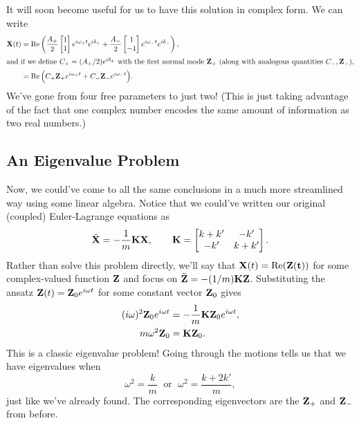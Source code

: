 \documentclass[../p111main.tex]{subfiles}
\begin{document}
It will soon become useful for us to have this solution in complex form.
We can write
\begin{align*}
    \mathbf{X}(t) &= \operatorname{Re} \left( \frac{A_+}{2} \begin{bmatrix} 1 \\ 1 \end{bmatrix} e^{i \omega_+ t} e^{i \delta_+} + \frac{A_-}{2} \begin{bmatrix} 1 \\ -1 \end{bmatrix} e^{i \omega_- t} e^{i \delta_-} \right), \\
    \intertext{and if we define $C_+ = (A_+ / 2) e^{i\delta_+}$ with the first normal mode $\mathbf{Z}_+$ (along with analogous quantities $C_-, \mathbf{Z}_-$),}
    &= \operatorname{Re} \Big( C_+ \mathbf{Z}_+ e^{i\omega_+ t} + C_- \mathbf{Z}_- e^{i\omega_- t} \Big).
\end{align*}
We've gone from four free parameters to just two!
(This is just taking advantage of the fact that one complex number encodes the same amount of information as two real numbers.)

\subsection*{An Eigenvalue Problem}
Now, we could've come to all the same conclusions in a much more streamlined way using some linear algebra.
Notice that we could've written our original (coupled) Euler-Lagrange equations as
\[ \ddot{\mathbf{X}} = -\frac{1}{m} \mathbf{K} \mathbf{X}, \qquad \mathbf{K} = \begin{bmatrix} k + k' & -k' \\ -k' & k + k' \end{bmatrix}. \]
Rather than solve this problem directly, we'll say that $\mathbf{X}(t) = \operatorname{Re} (\mathbf{Z(t)})$ for some complex-valued function $\mathbf{Z}$ and focus on $\ddot{\mathbf{Z}} = -(1 / m) \mathbf{K} \mathbf{Z}$.
Substituting the ansatz $\mathbf{Z}(t) = \mathbf{Z}_0 e^{i \omega t}$ for some constant vector $\mathbf{Z}_0$ gives
\begin{align*}
    (i\omega)^2 \mathbf{Z}_0 e^{i\omega t} &= -\frac{1}{m} \mathbf{K} \mathbf{Z}_0 e^{i\omega t}, \\
    m \omega^2 \mathbf{Z}_0 &= \mathbf{K} \mathbf{Z}_0.
\end{align*}
This is a classic eigenvalue problem!
Going through the motions tells us that we have eigenvalues when
\[ \omega^2 = \frac{k}{m} \;\text{ or }\; \omega^2 = \frac{k + 2k'}{m}, \]
just like we've already found.
The corresponding eigenvectors are the $\mathbf{Z}_+$ and $\mathbf{Z}_-$ from before.
\end{document}
